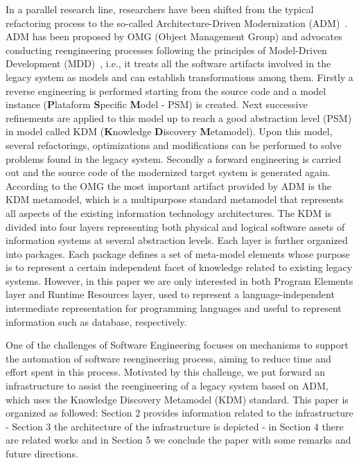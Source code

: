 In a parallel research line, researchers have been shifted from the typical refactoring process to the so-called Architecture-Driven Modernization (ADM)~\cite{ADMBook}. ADM has been proposed by OMG (Object Management Group)  and advocates conducting reengineering processes following the principles of Model-Driven Development (MDD)~\cite{ADMBook}, i.e., it treats all the software artifacts involved in the legacy system as models and can establish transformations among them. Firstly a reverse engineering is performed starting from the source code and a model instance (\textbf{P}lataform \textbf{S}pecific \textbf{M}odel - PSM) is created. Next successive refinements are applied to this model up to reach a good abstraction level (PSM) in model called KDM (\textbf{K}nowledge \textbf{D}iscovery \textbf{M}etamodel). Upon this model, several refactorings, optimizations and modifications can be performed to solve problems found in the legacy system. Secondly a forward engineering is carried out and the source code of the modernized target system is generated again. According to the OMG the most important artifact provided by ADM is the KDM metamodel, which is a multipurpose standard metamodel that represents all aspects of the existing information  technology architectures. The KDM is divided into four layers representing both physical and logical software assets of information systems at several abstraction levels. Each layer is further organized into packages. Each package defines a set of meta-model elements whose purpose is to represent a certain independent facet of knowledge related to existing legacy systems.  However, in this paper we are only interested in both Program Elements layer and Runtime Resources layer, used to represent a language-independent intermediate representation for programming languages and useful to represent information such as database, respectively.

One of the challenges of Software Engineering focuses on mechanisms to support the automation of software reengineering process, aiming to reduce time and effort spent in this process.
 Motivated by this challenge, we put forward an infrastructure to assist the reengineering of a legacy system based on ADM, which uses the Knowledge Discovery Metamodel (KDM) standard. 
This paper is organized as followed: Section 2 provides information related to the infrastructure - Section 3 the architecture of the infrastructure is depicted - in Section 4 there are related works and in Section 5 we conclude the paper with some remarks and future directions.